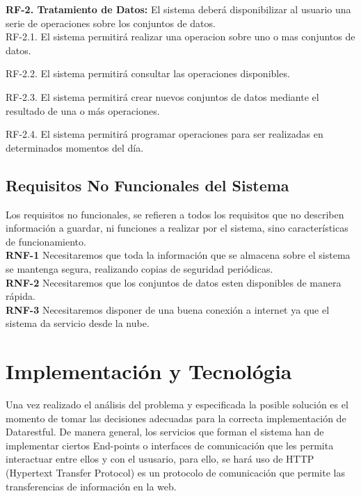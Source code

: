 \documentclass[a4paper,11pt]{book}
\begin{document}
\textbf{RF-2. Tratamiento de Datos:} El sistema deberá disponibilizar al usuario una serie de operaciones sobre los conjuntos de datos. \\   


	RF-2.1. El sistema permitirá realizar una operacion sobre uno o mas conjuntos de datos. 

	RF-2.2. El sistema permitirá consultar las operaciones disponibles. 

	RF-2.3. El sistema permitirá crear nuevos conjuntos de datos mediante el resultado de una o más operaciones. 

	RF-2.4. El sistema permitirá programar operaciones para ser realizadas en determinados momentos del día. 
	
\subsection{Requisitos No Funcionales del Sistema}

Los requisitos no funcionales, se refieren a todos los requisitos que no describen información a guardar, ni funciones a realizar por el sistema, sino características de funcionamiento.\\


\textbf{RNF-1} Necesitaremos que toda la información que se almacena sobre el sistema se mantenga segura, realizando copias de seguridad periódicas. \\

\textbf{RNF-2} Necesitaremos que los conjuntos de datos esten disponibles de manera rápida. \\

\textbf{RNF-3} Necesitaremos disponer de una buena conexión a internet ya que el sistema da servicio desde la nube. \\ 


\section{Implementación y Tecnológia}

Una vez realizado el análisis del problema y especificada la posible solución es el momento de tomar las decisiones adecuadas para la correcta implementación de Datarestful. De manera general, los servicios que forman el sistema han de implementar ciertos End-points o interfaces de comunicación que les permita interactuar entre ellos y con el ususario, para ello, se hará uso de HTTP (Hypertext Transfer Protocol) es un protocolo de comunicación que permite las transferencias de información en la web. 
\end{document}
